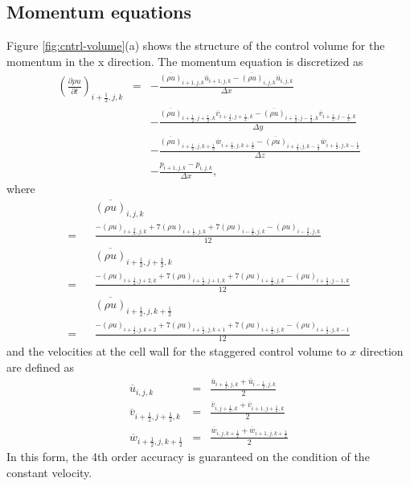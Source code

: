 \subsection{Momentum equations}
Figure \ref{fig:cntrl-volume}(a) shows the structure of the control volume for the momentum
in the x direction.
The momentum equation is discretized as
\begin{eqnarray}
\left(\frac{\partial \rho u}{\partial t}\right)_{i+\frac{1}{2},j,k}
&=& - \frac{\overline{(\rho u)}_{i+1,j,k} \overline{u}_{i+1,j,k}
           -\overline{(\rho u)}_{i,j,k} \overline{u}_{i,j,k}}
     {\Delta x}\nonumber\\
& & - \frac{\overline{(\rho u)}_{i+\frac{1}{2},j+\frac{1}{2},k}  \overline{v}_{i+\frac{1}{2},j+\frac{1}{2},k}
           -\overline{(\rho u)}_{i+\frac{1}{2},j-\frac{1}{2},k}  \overline{v}_{i+\frac{1}{2},j-\frac{1}{2},k}}
     {\Delta y}\nonumber\\
& & - \frac{\overline{(\rho u)}_{i+\frac{1}{2},j,k+\frac{1}{2}}  \overline{w}_{i+\frac{1}{2},j,k+\frac{1}{2}}
           -\overline{(\rho u)}_{i+\frac{1}{2},j,k-\frac{1}{2}}  \overline{w}_{i+\frac{1}{2},j,k-\frac{1}{2}}}
     {\Delta z}\nonumber\\
& & -\frac{p_{i+1,j,k}-p_{i,j,k}}{\Delta x},
\end{eqnarray}
where
\begin{eqnarray}
&& \overline{(\rho u)}_{i,j,k} \nonumber\\
= && \frac{-(\rho u)_{i+\frac{3}{2},j,k}+7(\rho u)_{i+\frac{1}{2},j,k}+7(\rho u)_{i-\frac{1}{2},j,k}-(\rho u)_{i-\frac{3}{2},j,k}}{12}\\
&& \overline{(\rho u)}_{i+\frac{1}{2},j+\frac{1}{2},k} \nonumber\\
= && \frac{-(\rho u)_{i+\frac{1}{2},j+2,k}+7(\rho u)_{i+\frac{1}{2},j+1,k}+7(\rho u)_{i+\frac{1}{2},j,k}-(\rho u)_{i+\frac{1}{2},j-1,k}}{12}\\
&& \overline{(\rho u)}_{i+\frac{1}{2},j,k+\frac{1}{2}} \nonumber\\
= &&\frac{-(\rho u)_{i+\frac{1}{2},j,k+2}+7(\rho u)_{i+\frac{1}{2},j,k+1}+7(\rho u)_{i+\frac{1}{2},j,k}-(\rho u)_{i+\frac{1}{2},j,k-1}}{12}
\end{eqnarray}
and the velocities at the cell wall for the staggered control volume to $x$ direction are
defined as
\begin{eqnarray}
\overline{u}_{i,j,k} &=& \frac{\overline{u}_{i+\frac{1}{2},j,k}+\overline{u}_{i-\frac{1}{2},j,k}}{2}\\
\overline{v}_{i+\frac{1}{2},j+\frac{1}{2},k} &=&
\frac{\overline{v}_{i,j+\frac{1}{2},k}+\overline{v}_{i+1,j+\frac{1}{2},k}}{2}\\
\overline{w}_{i+\frac{1}{2},j,k+\frac{1}{2}} &=&
\frac{\overline{w}_{i,j,k+\frac{1}{2}}+\overline{w}_{i+1,j,k+\frac{1}{2}}}{2}
\end{eqnarray}
In this form, the 4th order accuracy is guaranteed
on the condition of the constant velocity.

